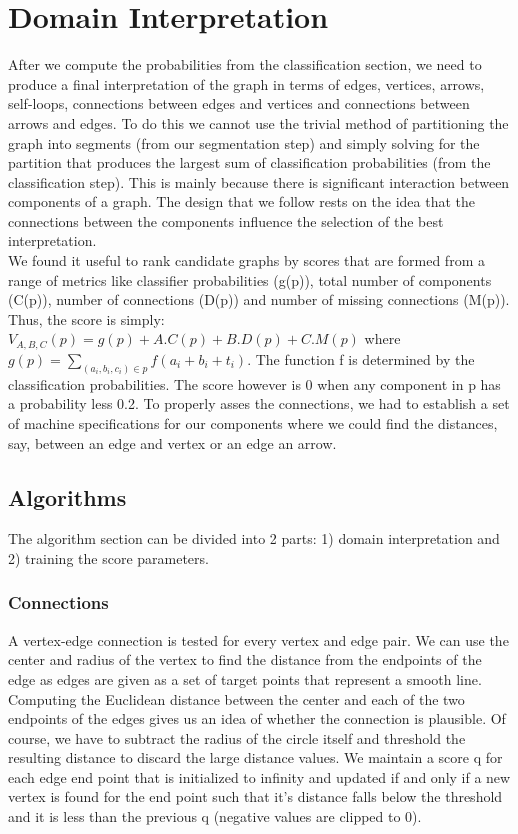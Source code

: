\section{Domain Interpretation}
\label{sec:interpretation}

After we compute the probabilities from the classification section, we need to produce a final interpretation of the graph in terms of edges, vertices, arrows, self-loops, connections between edges and vertices and connections between arrows and edges. To do this we cannot use the trivial method of partitioning the graph into segments (from our segmentation step) and  simply solving for the partition that produces the largest sum of classification probabilities (from the classification step). This is mainly because there is significant interaction between components of a graph. The design that we follow rests on the idea that the connections between the components influence the selection of the best interpretation.\\

We found it useful to rank candidate graphs by scores that are formed from a range of metrics like classifier probabilities (g(p)), total number of components (C(p)), number of connections (D(p)) and number of missing connections (M(p)). Thus, the score is simply: $V_{A,B,C}(p) = g(p) + A.C(p) + B.D(p) + C.M(p)$ where $g(p) = \sum_{(a_i,b_i,c_i) \in p}f(a_i+b_i+t_i)$. The function f is determined by the  classification probabilities. The score however is 0 when any component in p has a probability less 0.2. To properly asses the connections, we had to establish a set of machine specifications for our components where we could find the distances, say, between an edge and vertex or an edge an arrow.\\

\subsection{Algorithms}

The algorithm section can be divided into 2 parts: 1) domain interpretation and 2) training the score parameters.\\

\subsubsection{Connections}

A vertex-edge connection is tested for every vertex and edge pair. We can use the center and radius of the vertex to find the distance from the endpoints of the edge as edges are given as a set of target points that represent a smooth line. Computing the Euclidean distance between the center and each of the two endpoints of the edges gives us an idea of whether the connection is plausible. Of course, we have to subtract the radius of the circle itself and threshold the resulting distance to discard the large distance values. We maintain a score q for each edge end point that is initialized to infinity and updated if and only if a new vertex is found for the end point such that it's distance falls below the threshold and it is less than the previous q (negative values are clipped to 0).\\

